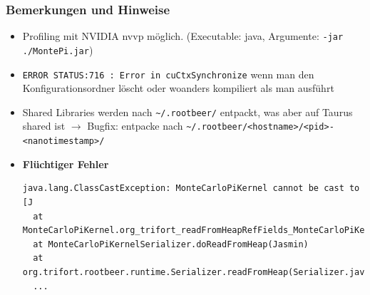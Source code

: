 \begin{frame}[fragile]
    \frametitle{Bemerkungen und Hinweise}
    \begin{itemize}
        \item Profiling mit NVIDIA nvvp möglich. (Executable: java, Argumente: \lstinline!-jar ./MontePi.jar!)
        \item \lstinline!ERROR STATUS:716 : Error in cuCtxSynchronize! wenn man den Konfigurationsordner löscht oder woanders kompiliert als man ausführt
        \item Shared Libraries werden nach \lstinline!~/.rootbeer/! entpackt, was aber auf Taurus shared ist $\rightarrow$ Bugfix: entpacke nach \lstinline!~/.rootbeer/<hostname>/<pid>-<nanotimestamp>/!
        \item \textbf{Flüchtiger Fehler} \begin{lstlisting}
java.lang.ClassCastException: MonteCarloPiKernel cannot be cast to [J
  at MonteCarloPiKernel.org_trifort_readFromHeapRefFields_MonteCarloPiKernel0(Jasmin)
  at MonteCarloPiKernelSerializer.doReadFromHeap(Jasmin)
  at org.trifort.rootbeer.runtime.Serializer.readFromHeap(Serializer.java:155)
  ...
\end{lstlisting}
    \end{itemize}
\end{frame}



